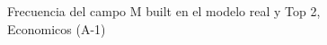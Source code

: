 \begin{figure}[H]
    \centering
    
    \caption{Frecuencia del campo M built en el modelo real y Top 2, Economicos (A-1)}
    \label{frecuency-M Built-top2}
\end{figure}